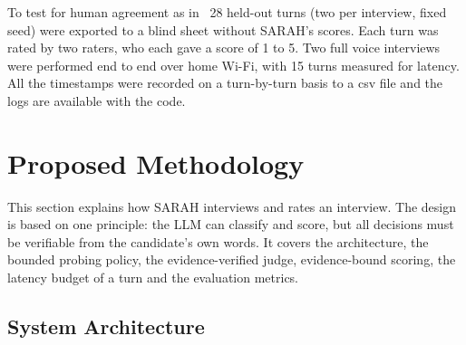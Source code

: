 \documentclass[conference]{IEEEtran}
\begin{document}
To test for human agreement as in~\cite{zheng2023} 28 held-out turns (two per interview, fixed seed) were exported to a blind sheet without SARAH's scores. Each turn was rated by two raters, who each gave a score of 1 to 5. Two full voice interviews were performed end to end over home Wi-Fi, with 15 turns measured for latency. All the timestamps were recorded on a turn-by-turn basis to a csv file and the logs are available with the code.

\section{Proposed Methodology}\label{sec:method}

This section explains how SARAH interviews and rates an interview. The design is based on one principle: the LLM can classify and score, but all decisions must be verifiable from the candidate's own words. It covers the architecture, the bounded probing policy, the evidence-verified judge, evidence-bound scoring, the latency budget of a turn and the evaluation metrics.

\subsection{System Architecture}
\end{document}
